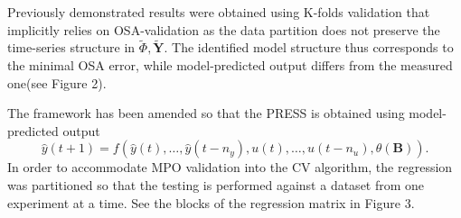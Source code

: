 \documentclass[a4paper,11pt,twoside]{article}
\theoremstyle{mytheoremstyle}
\begin{document}
\par Previously demonstrated results were obtained using K-folds validation that implicitly relies on OSA-validation as the data partition does not preserve the time-series structure in $\tilde{\Phi}, \tilde{\mathbf{Y}}$. The identified model structure thus corresponds to the minimal OSA error, while model-predicted output  differs from the measured one(see Figure 2).
\par The framework has been amended so that the PRESS is obtained using model-predicted output
\begin{equation}
\hat{y}(t+1) = f(\hat{y}(t),\dots,\hat{y}(t-n_y),u(t),\dots,u(t-n_u),\theta(\mathbf{B})). 
\end{equation}
In order to accommodate MPO validation into the CV algorithm, the regression was partitioned so that the testing is performed against a dataset from one experiment at a time. See the blocks of the regression matrix in Figure 3.
\end{document}
